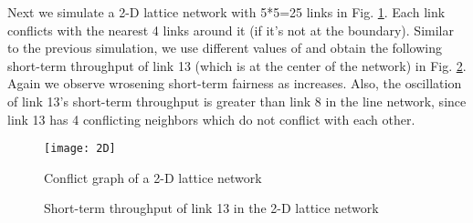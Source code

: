 \documentclass{IEEEtran}
\begin{document}
Next we simulate a 2-D lattice network with 5{*}5=25 links in Fig.
\ref{fig:2d}. Each link conflicts with the nearest 4 links around
it (if it's not at the boundary). Similar to the previous simulation,
we use different values of  and obtain the following short-term
throughput of link 13 (which is at the center of the network) in Fig.
\ref{fig:st-2d}. Again we observe wrosening short-term fairness as
 increases. Also, the oscillation of link 13's short-term
throughput is greater than link 8 in the line network, since link
13 has 4 conflicting neighbors which do not conflict with each other.
\begin{figure}
\begin{centering}
\texttt{[image: 2D]}
\par\end{centering}

\caption{\label{fig:2d}Conflict graph of a 2-D lattice network}

\end{figure}
\begin{figure}
\begin{centering}
\par\end{centering}

\begin{centering}
\par\end{centering}

\begin{centering}
\par\end{centering}

\begin{centering}
\par\end{centering}

\caption{\label{fig:st-2d}Short-term throughput of link 13 in the 2-D lattice
network}

\end{figure}
\end{document}
